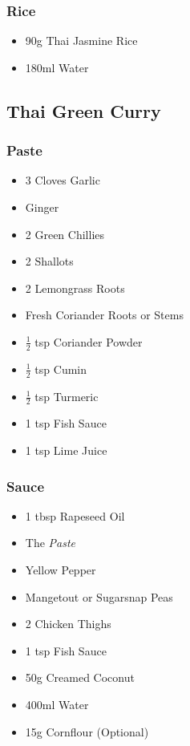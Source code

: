 \documentclass[11pt, english]{article}
\begin{document}
		\subsubsection*{Rice}

	\begin{itemize}
        \setlength\itemsep{0cm}
                \item 90g Thai Jasmine Rice
		\item 180ml Water
        \end{itemize}

\newpage

	\subsection{Thai Green Curry}

		\subsubsection*{Paste}

	\begin{itemize}
        \setlength\itemsep{0cm}
                \item 3 Cloves Garlic
                \item Ginger
                \item 2 Green Chillies
                \item 2 Shallots
                \item 2 Lemongrass Roots
                \item Fresh Coriander Roots or Stems
		\item $\frac{1}{2}$ tsp Coriander Powder
                \item $\frac{1}{2}$ tsp Cumin
		\item $\frac{1}{2}$ tsp Turmeric
                \item 1 tsp Fish Sauce
                \item 1 tsp Lime Juice
        \end{itemize}

		\subsubsection*{Sauce}

	\begin{itemize}
        \setlength\itemsep{0cm}
                \item 1 tbsp Rapeseed Oil
                \item The \textit{Paste}
                \item Yellow Pepper
		\item Mangetout or Sugarsnap Peas
                \item 2 Chicken Thighs
                \item 1 tsp Fish Sauce
                \item 50g Creamed Coconut
		\item 400ml Water
		\item 15g Cornflour (Optional)
        \end{itemize}
\end{document}
